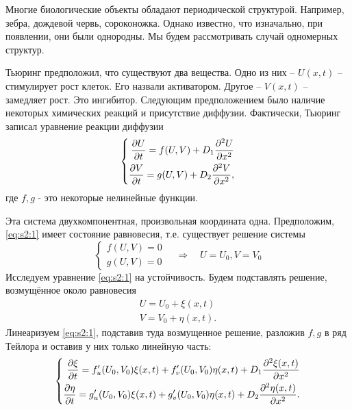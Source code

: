 
Многие биологические объекты обладают периодической структурой. Например, зебра, дождевой червь, сороконожка. Однако известно, что изначально, при появлении, они были однородны. Мы будем рассмотривать случай одномерных структур.

Тьюринг предположил, что существуют два вещества. Одно из них -- $U(x,t)$ -- стимулирует рост клеток. Его назвали активатором. Другое -- $V(x,t)$ -- замедляет рост. Это ингибитор. Следующим предположением было наличие некоторых химических реакций и присутствие диффузии. Фактически, Тьюринг записал уравнение реакции диффузии
\begin{equation}
\left\{\begin{aligned}
	\pdv{U}{t}=f(U,V)+D_1 \pdv[2]{U}{x} \\
	\pdv{V}{t}=g(U,V)+D_2 \pdv[2]{V}{x},
\end{aligned}\right.
	\label{eq:s2:1}
\end{equation}
где $f,g$  - это некоторые нелинейные функции.

Эта система двухкомпонентная, произвольная координата одна. Предположим, \eqref{eq:s2:1} имеет состояние равновесия, т.е. существует решение системы
\begin{equation}
\left\{\begin{aligned}
		f(U,V)=0 \\
		g(U,V)=0
	\end{aligned}\right.	\quad \Rightarrow \quad U=U_0, V=V_0
	\label{eq:s2:2}
\end{equation}
Исследуем уравнение \eqref{eq:s2:1} на устойчивость. Будем подставлять решение, возмущённое около равновесия
\begin{gather*}
	U=U_0+\xi(x,t) \\
	V=V_0+\eta(x,t).
\end{gather*}
Линеаризуем \eqref{eq:s2:1}, подставив туда возмущенное решение, разложив $f, g$ в ряд Тейлора и оставив у них только линейную часть:
\begin{equation}
	\left\{\begin{aligned}
		\pdv{\xi}{t}=f'_u(U_0, V_0)\xi(x,t)+f'_v(U_0, V_0)\eta(x,t)+D_1 \pdv[2]{\xi(x,t)}{x} \\
		\pdv{\eta}{t}=g'_u(U_0, V_0)\xi(x,t)+g'_v(U_0, V_0)\eta(x,t)+D_2 \pdv[2]{\eta(x,t)}{x}.
	\end{aligned}\right.
	\label{eq:s2:3}
\end{equation}

